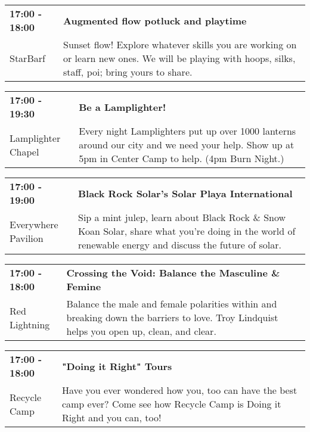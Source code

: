 \begin{tabular}{ p{1in} p{2.2in} }
    \textbf{17:00 - 18:00} & \textbf{Augmented flow potluck and playtime} \\
    StarBarf \newline  & Sunset flow! Explore whatever skills you are working on or learn new ones. We will be playing with hoops, silks, staff, poi; bring yours to share. \\
    \hline 
\end{tabular}
    
\begin{tabular}{ p{1in} p{2.2in} }
    \textbf{17:00 - 19:30} & \textbf{Be a Lamplighter!} \\
    Lamplighter Chapel \newline  & Every night Lamplighters put up over 1000 lanterns around our city and we need your help. Show up at 5pm in Center Camp to help. (4pm Burn Night.) \\
    \hline 
\end{tabular}
    
\begin{tabular}{ p{1in} p{2.2in} }
    \textbf{17:00 - 19:00} & \textbf{Black Rock Solar's Solar Playa International} \\
    Everywhere Pavilion \newline  & Sip a mint julep, learn about Black Rock \& Snow Koan Solar, share what you're doing in the world of renewable energy and discuss the future of solar. \\
    \hline 
\end{tabular}
    
\begin{tabular}{ p{1in} p{2.2in} }
    \textbf{17:00 - 18:00} & \textbf{Crossing the Void: Balance the Masculine \& Femine} \\
    Red Lightning \newline  & Balance the male and female polarities within and breaking down the barriers to love. Troy Lindquist helps you open up, clean, and clear. \\
    \hline 
\end{tabular}
    
\begin{tabular}{ p{1in} p{2.2in} }
    \textbf{17:00 - 18:00} & \textbf{"Doing it Right" Tours} \\
    Recycle Camp \newline  & Have you ever wondered how you, too can have the best camp ever? Come see how Recycle Camp is Doing it Right and you can, too! \\
    \hline 
\end{tabular}
    
